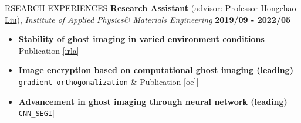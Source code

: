 \documentclass[11pt]{article} %
\begin{document}
\begin{section}{RSEARCH EXPERIENCES}
\textbf{Research Assistant} (advisor: \href{mailto:hcliu@um.edu.mo}{Professor Hongchao Liu}), \textit{Institute of Applied Physics\& Materials Engineering} \hfill \textbf{2019/09 - 2022/05} 
\begin{itemize}[leftmargin=1.5em]
    \item \textbf{Stability of ghost imaging in varied environment conditions} 
    \hfill {\footnotesize Publication \ref{irla}}| %
    \item \textbf{Image encryption based on computational ghost imaging (leading)} 
    \hfill {\footnotesize \href{https://github.com/Chisen-Lupus/gradient-orthogonalization}{\texttt{gradient-orthogonalization}} \& Publication \ref{oe}}| %
    \item \textbf{Advancement in ghost imaging through neural network (leading)} 
    \hfill {\footnotesize \href{https://github.com/Chisen-Lupus/CNN_SEGI}{\texttt{CNN\_SEGI}}}| %
\end{itemize}

\end{section}

\end{document}
